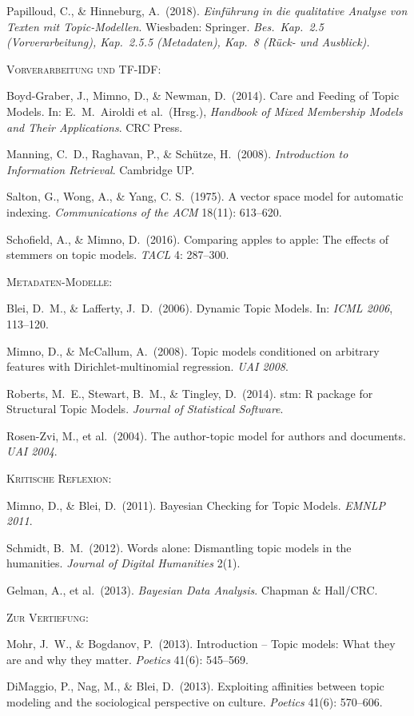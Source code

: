 \documentclass[a4paper,11pt]{article}
\begin{document}
Papilloud, C., \& Hinneburg, A.\ (2018). \emph{Einführung in die
qualitative Analyse von Texten mit Topic-Modellen}. Wiesbaden:
Springer. \emph{Bes.\ Kap.~2.5 (Vorverarbeitung), Kap.~2.5.5 (Metadaten),
Kap.~8 (Rück- und Ausblick).}

\bigskip

\textsc{Vorverarbeitung und TF-IDF:}

Boyd-Graber, J., Mimno, D., \& Newman, D.\ (2014). Care and Feeding
of Topic Models. In: E.~M.\ Airoldi et al.\ (Hrsg.), \emph{Handbook
of Mixed Membership Models and Their Applications}. CRC Press.

Manning, C.\ D., Raghavan, P., \& Schütze, H.\ (2008). \emph{Introduction
to Information Retrieval}. Cambridge UP.

Salton, G., Wong, A., \& Yang, C. S.\ (1975). A vector space model
for automatic indexing. \emph{Communications of the ACM} 18(11):
613--620.

Schofield, A., \& Mimno, D.\ (2016). Comparing apples to apple: The
effects of stemmers on topic models. \emph{TACL} 4: 287--300.

\bigskip

\textsc{Metadaten-Modelle:}

Blei, D.\ M., \& Lafferty, J.\ D.\ (2006). Dynamic Topic Models.
In: \emph{ICML 2006}, 113--120.

Mimno, D., \& McCallum, A.\ (2008). Topic models conditioned on
arbitrary features with Dirichlet-multinomial regression.
\emph{UAI 2008}.

Roberts, M.\ E., Stewart, B.\ M., \& Tingley, D.\ (2014). stm:
R package for Structural Topic Models. \emph{Journal of Statistical
Software}.

Rosen-Zvi, M., et al.\ (2004). The author-topic model for authors
and documents. \emph{UAI 2004}.

\bigskip

\textsc{Kritische Reflexion:}

Mimno, D., \& Blei, D.\ (2011). Bayesian Checking for Topic Models.
\emph{EMNLP 2011}.

Schmidt, B.\ M.\ (2012). Words alone: Dismantling topic models in
the humanities. \emph{Journal of Digital Humanities} 2(1).

Gelman, A., et al.\ (2013). \emph{Bayesian Data Analysis}.
Chapman \& Hall/CRC.

\bigskip

\textsc{Zur Vertiefung:}

Mohr, J.\ W., \& Bogdanov, P.\ (2013). Introduction -- Topic models:
What they are and why they matter. \emph{Poetics} 41(6): 545--569.

DiMaggio, P., Nag, M., \& Blei, D.\ (2013). Exploiting affinities
between topic modeling and the sociological perspective on culture.
\emph{Poetics} 41(6): 570--606.
\end{document}
